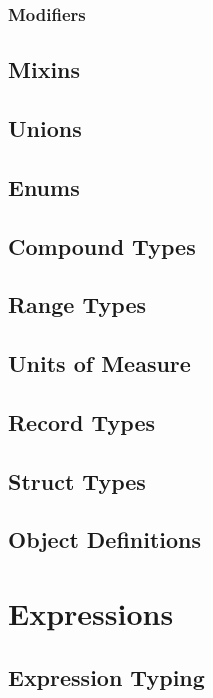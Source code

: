 \subsection{Modifiers}

\section{Mixins}

\section{Unions}

\section{Enums}

\section{Compound Types}

\section{Range Types}

\section{Units of Measure}

\section{Record Types}

\section{Struct Types}

\section{Object Definitions}

\chapter{Expressions}

\section{Expression Typing}


